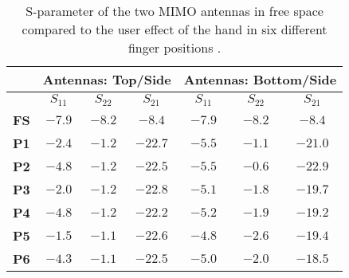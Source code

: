 \begin{table}[htbp]
  \centering
  \begin{tabular}{|c|c|c|c|c|c|c|}
    \hline
    & \multicolumn{3}{c|}{\textbf{Antennas: Top/Side}} & \multicolumn{3}{c|}{\textbf{Antennas: Bottom/Side}} \\ \hline
                  & $S_{11}$ & $S_{22}$ & $S_{21}$ & $S_{11}$ & $S_{22}$ & $S_{21}$             \\ \hline
    \textbf{FS}   & $-7.9$   & $-8.2$   & $-8.4 $  & $-7.9$   & $-8.2$   & $-8.4 $           \\ \hline
    \textbf{P1}   & $-2.4$   & $-1.2$   & $-22.7$  & $-5.5$   & $-1.1$   & $-21.0$           \\ \hline
    \textbf{P2}   & $-4.8$   & $-1.2$   & $-22.5$  & $-5.5$   & $-0.6$   & $-22.9$           \\ \hline
    \textbf{P3}   & $-2.0$   & $-1.2$   & $-22.8$  & $-5.1$   & $-1.8$   & $-19.7$           \\ \hline
    \textbf{P4}   & $-4.8$   & $-1.2$   & $-22.2$  & $-5.2$   & $-1.9$   & $-19.2$           \\ \hline
    \textbf{P5}   & $-1.5$   & $-1.1$   & $-22.6$  & $-4.8$   & $-2.6$   & $-19.4$           \\ \hline
    \textbf{P6}   & $-4.3$   & $-1.1$   & $-22.5$  & $-5.0$   & $-2.0$   & $-18.5$           \\ \hline
  \end{tabular}
  \caption{S-parameter of the two MIMO antennas in free space compared to the user effect of the hand in six different finger positions \cite{Samantha2014UserEff}.}
  \label{tab:usereff_s11}
\end{table}

